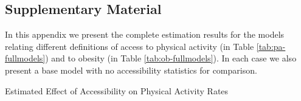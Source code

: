 \documentclass[shortAfour,sageh.bst]{sagej}
\begin{document}




\hypertarget{appendix}{%
\subsection{Supplementary Material}\label{appendix}}
\setcounter{table}{0}
\renewcommand{\thetable}{S\arabic{table}}

In this appendix we present the complete estimation results for the
models relating different definitions of access to physical activity (in
Table \ref{tab:pa-fullmodels}) and to obesity (in Table
\ref{tab:ob-fullmodels}). In each case we also present a base model with
no accessibility statistics for comparison.

\begin{table*}
  \caption{\label{tab:pa-fullmodels} Estimated Effect of Accessibility on Physical Activity Rates}
  \begin{center}
  \scalebox{0.8}{

}
\end{center}
\end{table*}
\end{document}
